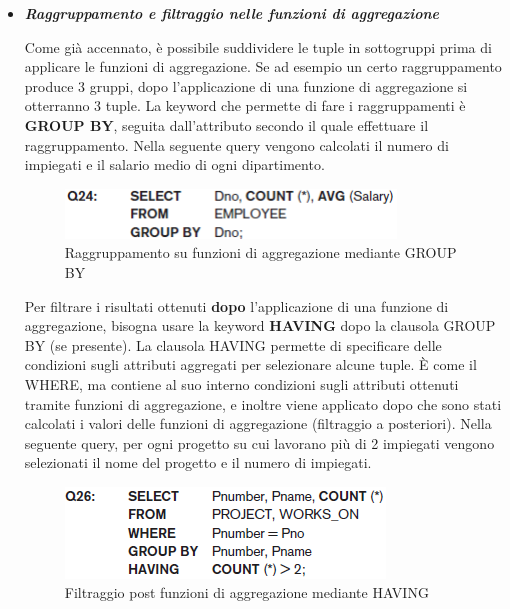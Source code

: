 \begin{itemize}
\begin{itemize}
\end{itemize}


\item{\textbf{\textit{Raggruppamento e filtraggio nelle funzioni di aggregazione}}}

Come già accennato, è possibile suddividere le tuple in sottogruppi prima di applicare le funzioni di aggregazione. Se ad esempio un certo raggruppamento produce 3 gruppi, dopo l’applicazione di una funzione di aggregazione si otterranno 3 tuple. La keyword che permette di fare i raggruppamenti è \textbf{GROUP BY}, seguita dall’attributo secondo il quale effettuare il raggruppamento. Nella seguente query vengono calcolati il numero di impiegati e il salario medio di ogni dipartimento. 


\begin{center}
\begin{figure}[H]
\centering
\includegraphics[scale=1]{figures/count_avg_groupby.png}
\caption{Raggruppamento su funzioni di aggregazione mediante GROUP BY} 
\end{figure}
\end{center}

Per filtrare i risultati ottenuti \textbf{dopo} l’applicazione di una funzione di aggregazione, bisogna usare la keyword \textbf{HAVING} dopo la clausola GROUP BY (se presente). La clausola HAVING permette di specificare delle condizioni sugli attributi aggregati per selezionare alcune tuple. È come il WHERE, ma contiene al suo interno condizioni sugli attributi ottenuti tramite funzioni di aggregazione, e inoltre viene applicato dopo che sono stati calcolati i valori delle funzioni di aggregazione (filtraggio a posteriori). Nella seguente query, per ogni progetto su cui lavorano più di 2 impiegati vengono selezionati il nome del progetto e il numero di impiegati. 

\begin{center}
\begin{figure}[H]
\centering
\includegraphics[scale=1]{figures/having_count.png}
\caption{Filtraggio post funzioni di aggregazione mediante HAVING} 
\end{figure}
\end{center}


\end{itemize}
